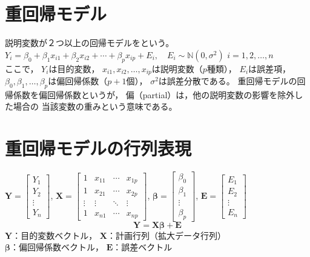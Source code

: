 \newcommand{\Draft}{}
\newcommand{\Slide}{}
\newcommand{\PrintLecture}{1}
\newcommand{\PrintSolution}{1}







\maketitle

\MyFrame{}{\tableofcontents}

\section{重回帰モデル}

\MyFrame{\insertsection}
{
  {
    説明変数が２つ以上の回帰モデルをという。
    $Y_i=\beta_0+\beta_1 x_{i1}+\beta_2 x_{i2}
    +\cdots+\beta_p x_{ip}+E_i,\quad E_i\sim \mathbb{N}(0,\sigma^2)$
    $i=1,2,\dots,n$\\
    ここで，
    $Y_i$は目的変数，
    $x_{i1}, x_{i2},\dots, x_{ip}$は説明変数（$p$種類），
    $E_i$は誤差項，
    $\beta_0, \beta_1,\dots, \beta_p$は偏回帰係数（$p+1$個），
    $\sigma^2$は誤差分散である。
  }
  重回帰モデルの回帰係数を偏回帰係数というが，
  偏（partial）は，他の説明変数の影響を除外した場合の
  当該変数の重みという意味である。
}

\section{重回帰モデルの行列表現}

\MyFrame{\insertsection}
{
  $\bm{Y}=
  \begin{bmatrix}
    Y_1\\
    Y_2\\
    \vdots\\
    Y_n
  \end{bmatrix}$,
  $\bm{X}=
  \begin{bmatrix}
    1      & x_{11} & \cdots & x_{1p}\\
    1      & x_{21} & \cdots & x_{2p}\\
    \vdots & \vdots & \ddots & \vdots\\
    1      & x_{n1} & \cdots & x_{np}
  \end{bmatrix}$,
  $\bm{\beta}=
  \begin{bmatrix}
    \beta_0\\
    \beta_1\\
    \vdots\\
    \beta_p
  \end{bmatrix}$,
  $\bm{E}=
  \begin{bmatrix}
    E_1\\
    E_2\\
    \vdots\\
    E_n
  \end{bmatrix}$
%
  \[\bm{Y}=\bm{X}\bm{\beta}+\bm{E}\]
  $\bm{Y}$：目的変数ベクトル，
  $\bm{X}$：計画行列（拡大データ行列）\\
  $\bm{\beta}$：偏回帰係数ベクトル，
  $\bm{E}$：誤差ベクトル
}

